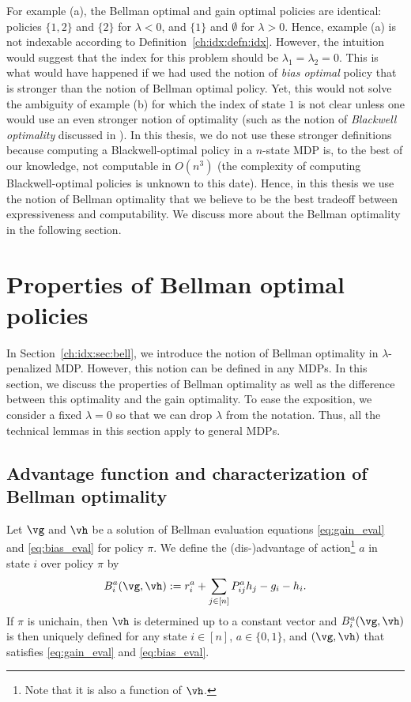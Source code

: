 For example (a), the Bellman optimal and gain optimal policies are identical: policies $\{1,2\}$ and $\{2\}$ for $\lambda<0$, and $\{1\}$ and $\emptyset$ for $\lambda>0$.
Hence, example (a) is not indexable according to Definition~\ref{ch:idx:defn:idx}.
However, the intuition would suggest that the index for this problem should be $\lambda_1=\lambda_2=0$. This is what would have happened if we had used the notion of \emph{bias optimal} policy that is stronger than the notion of Bellman optimal policy. Yet, this would not solve the ambiguity of example (b) for which the index of state $1$ is not clear unless one would use an even  stronger notion of optimality (such as the notion of \emph{Blackwell optimality} discussed in \cite[Chapter~10]{puterman2014markov}). In this thesis, we do not use these stronger definitions because computing a Blackwell-optimal policy in a $n$-state MDP is, to the best of our knowledge, not computable in $O(n^3)$ (the complexity of computing Blackwell-optimal policies is unknown to this date). Hence, in this thesis we use the notion of Bellman optimality that we believe to be the best tradeoff between expressiveness and computability. We discuss more about the Bellman optimality in the following section.

\section{Properties of Bellman optimal policies}
\label{ch:idx:sec:prop_bell}

In Section~\ref{ch:idx:sec:bell}, we introduce the notion of Bellman optimality in $\lambda$-penalized MDP.
However, this notion can be defined in any MDPs.
In this section, we discuss the properties of Bellman optimality as well as the difference between this optimality and the gain optimality.
To ease the exposition, we consider a fixed $\lambda=0$ so that we can drop $\lambda$ from the notation.
Thus, all the technical lemmas in this section apply to general MDPs.

\subsection{Advantage function and characterization of Bellman optimality}

Let $\vg$ and $\vh$ be a solution of Bellman evaluation equations \eqref{eq:gain_eval} and \eqref{eq:bias_eval} for policy $\pi$.
We define the (dis-)advantage of action\footnote{Note that it is also a function of $\vh$.} $a$ in state $i$ over policy $\pi$ by
\begin{equation}
    \label{ch:idx:eq:advan}
    B^a_i(\vg,\vh) := r^a_i +\sum_{j\in[n]}P^a_{ij}h_j -g_i -h_i.
\end{equation}
If $\pi$ is unichain, then $\vh$ is determined up to a constant vector and $B^a_i(\vg,\vh)$ is then uniquely defined for any state $i\in[n]$, $a\in\{0,1\}$, and $(\vg,\vh)$ that satisfies \eqref{eq:gain_eval} and \eqref{eq:bias_eval}.

